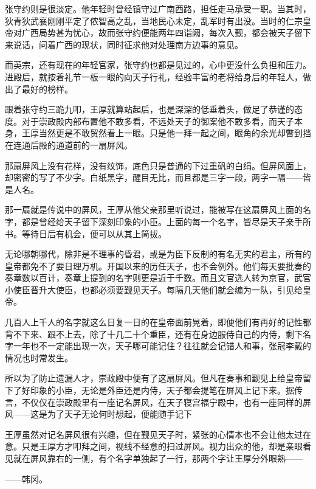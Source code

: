 张守约则是很淡定。他年轻时曾经镇守过广南西路，担任走马承受一职。当其时，狄青狄武襄刚刚平定了侬智高之乱，当地民心未定，乱军时有出没。当时的仁宗皇帝对广西局势甚为忧心，故而张守约便能两年四诣阙，每次入觐，都会被天子留下来说话，问着广西的现状，同时征求他对处理南方边事的意见。

而英宗，还有现在的年轻官家，张守约也都是见过的，心中更没什么负担和压力。进殿后，就按着礼节一板一眼的向天子行礼，经验丰富的老将给身后的年轻人，做出了最好的榜样。

跟着张守约三跪九叩，王厚就算站起后，也是深深的低垂着头，做足了恭谨的态度。对于崇政殿内部布置他不敢多看，不远处天子的御案他不敢多看，而天子本身，王厚当然更是不敢贸然看上一眼。只是他一拜一起之间，眼角的余光却瞥到挡在连通后殿的通道前的一扇屏风。

那扇屏风上没有花样，没有纹饰，底色只是普通的下过重矾的白绢。但屏风面上，却密密的写了不少字。白纸黑字，醒目无比，而且都是三字一段，两字一隔——皆是人名。

那一扇就是传说中的屏风，王厚从他父亲那里听说过，能被写在这扇屏风上面的名字，都是曾经给天子留下深刻印象的小臣。上面的每一个名字，皆尽是天子亲手所书。等待日后有机会，便可以从其上简拔。

无论哪朝哪代，除非是不理事的昏君，或是为臣下反制的有名无实的君主，所有的皇帝都免不了要日理万机。开国以来的历任天子，也不会例外。他们每天要批奏的奏章数以百计，奏章上提到的名字则更是近于千数。而且文官选人转为京官，武官小使臣晋升大使臣，也都必须要觐见天子。每隔几天他们就会编为一队，引见给皇帝。

几百人上千人的名字就这么日复一日的在皇帝面前晃着，即便他们有再好的记性都背不下来、跟不上去，除了十几二十个重臣，还有在身边服侍自己的内侍，剩下名字一年也不一定能出现一次，天子哪可能记住？往往就会记错人和事，张冠李戴的情况也时常发生。

所以为了防止遗漏人才，崇政殿中便有了这扇屏风。但凡在奏事和觐见上给皇帝留下了好印象的小臣，无论是外臣还是内侍，天子都会提笔在屏风上记下来。据传言，不仅仅在崇政殿里有一座记名屏风，在天子寝宫福宁殿中，也有一座同样的屏风——这是为了天子无论何时想起，便能随手记下

王厚虽然对记名屏风很有兴趣，但在觐见天子时，紧张的心情本也不会让他太过在意。只是王厚方才叩拜之间，视线不经意的扫过屏风。视力出众的他，却是亲眼看见就在屏风靠右的一侧，有个名字单独起了一行，那两个字让王厚分外眼熟——

——韩冈。


